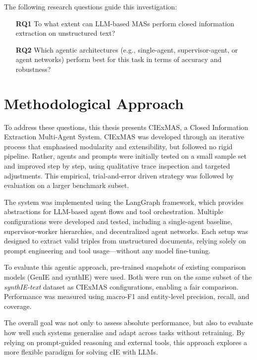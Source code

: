 \documentclass[a4paper,oneside,bibliography=totoc]{scrbook}
\begin{document}
The following research questions guide this investigation:

\begin{itemize}
  \item[\textbf{RQ1}] To what extent can \ac{LLM}-based \acp{MAS} perform closed information extraction on unstructured text?
  \item[\textbf{RQ2}] Which agentic architectures (e.g., single-agent, supervisor-agent, or agent networks) perform best for this task in terms of accuracy and robustness?
\end{itemize}

\section{Methodological Approach}
\label{sec:methodology}

To address these questions, this thesis presents CIExMAS, a Closed Information Extraction Multi-Agent System. CIExMAS was developed through an iterative process that emphasised modularity and extensibility, but followed no rigid pipeline. Rather, agents and prompts were initially tested on a small sample set and improved step by step, using qualitative trace inspection and targeted adjustments. This empirical, trial-and-error driven strategy was followed by evaluation on a larger benchmark subset.

The system was implemented using the LangGraph framework, which provides abstractions for \ac{LLM}-based agent flows and tool orchestration. Multiple configurations were developed and tested, including a single-agent baseline, supervisor-worker hierarchies, and decentralized agent networks. Each setup was designed to extract valid triples from unstructured documents, relying solely on prompt engineering and tool usage—without any model fine-tuning.

To evaluate this agentic approach, pre-trained snapshots of existing comparison models (GenIE and synthIE) were used. Both were run on the same subset of the \textit{synthIE-text} dataset as CIExMAS configurations, enabling a fair comparison. Performance was measured using macro-F1 and entity-level precision, recall, and coverage.

The overall goal was not only to assess absolute performance, but also to evaluate how well such systems generalise and adapt across tasks without retraining. By relying on prompt-guided reasoning and external tools, this approach explores a more flexible paradigm for solving \ac{cIE} with \acp{LLM}.
\end{document}
